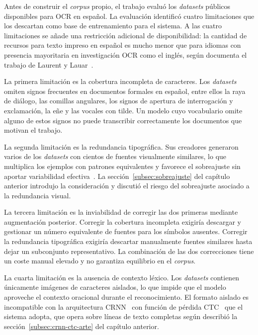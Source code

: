 Antes de construir el \textit{corpus} propio, el trabajo evaluó los \textit{datasets} públicos disponibles para OCR en español. La evaluación identificó cuatro limitaciones que los descartan como base de entrenamiento para el sistema. A las cuatro limitaciones se añade una restricción adicional de disponibilidad: la cantidad de recursos para texto impreso en español es mucho menor que para idiomas con presencia mayoritaria en investigación OCR como el inglés, según documenta el trabajo de Laurent y Lauar~\cite{laurent2024spanishtrocr}.

La primera limitación es la cobertura incompleta de caracteres. Los \textit{datasets} omiten signos frecuentes en documentos formales en español, entre ellos la raya de diálogo, las comillas angulares, los signos de apertura de interrogación y exclamación, la eñe y las vocales con tilde. Un modelo cuyo vocabulario omite alguno de estos signos no puede transcribir correctamente los documentos que motivan el trabajo.

La segunda limitación es la redundancia tipográfica. Sus creadores generaron varios de los \textit{datasets} con cientos de fuentes visualmente similares, lo que multiplica los ejemplos con patrones equivalentes y favorece el sobreajuste sin aportar variabilidad efectiva~\cite{goodfellow2016deeplearning}. La sección~\ref{subsec:sobreajuste} del capítulo anterior introdujo la consideración y discutió el riesgo del sobreajuste asociado a la redundancia visual.

La tercera limitación es la inviabilidad de corregir las dos primeras mediante augmentación posterior. Corregir la cobertura incompleta exigiría descargar y gestionar un número equivalente de fuentes para los símbolos ausentes. Corregir la redundancia tipográfica exigiría descartar manualmente fuentes similares hasta dejar un subconjunto representativo. La combinación de las dos correcciones tiene un coste manual elevado y no garantiza equilibrio en el \textit{corpus}.

La cuarta limitación es la ausencia de contexto léxico. Los \textit{datasets} contienen únicamente imágenes de caracteres aislados, lo que impide que el modelo aproveche el contexto oracional durante el reconocimiento. El formato aislado es incompatible con la arquitectura CRNN~\cite{shi2016crnn} con función de pérdida CTC~\cite{graves2006ctc} que el sistema adopta, que opera sobre líneas de texto completas según describió la sección~\ref{subsec:crnn-ctc-arte} del capítulo anterior.

